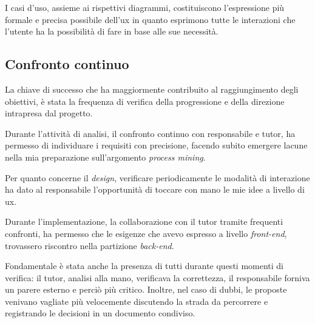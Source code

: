 I casi d'uso, assieme ai rispettivi diagrammi, costituiscono l'espressione più formale e precisa possibile dell'\acrshort{ux} in quanto esprimono tutte le interazioni che l'utente ha la possibilità di fare in base alle sue necessità.
\subsection{Confronto continuo}
La chiave di successo che ha maggiormente contribuito al raggiungimento degli obiettivi, è stata la frequenza di verifica della progressione e della direzione intrapresa dal progetto.

Durante l'attività di analisi, il confronto continuo con responsabile e tutor, ha permesso di individuare i requisiti con precisione, facendo subito emergere lacune nella mia preparazione sull'argomento \textit{process mining}.

Per quanto concerne il \textit{design}, verificare periodicamente le modalità di interazione ha dato al responsabile l'opportunità di toccare con mano le mie idee a livello di \acrshort{ux}.

Durante l'implementazione, la collaborazione con il tutor tramite frequenti confronti, ha permesso che le esigenze che avevo espresso a livello \textit{front-end}, trovassero riscontro nella partizione \textit{back-end}.

Fondamentale è stata anche la presenza di tutti durante questi momenti di verifica: il tutor, analisi alla mano, verificava la correttezza, il responsabile forniva un parere esterno e perciò più critico.
Inoltre, nel caso di dubbi, le proposte venivano vagliate più velocemente discutendo la strada da percorrere e registrando le decisioni in un documento condiviso.

